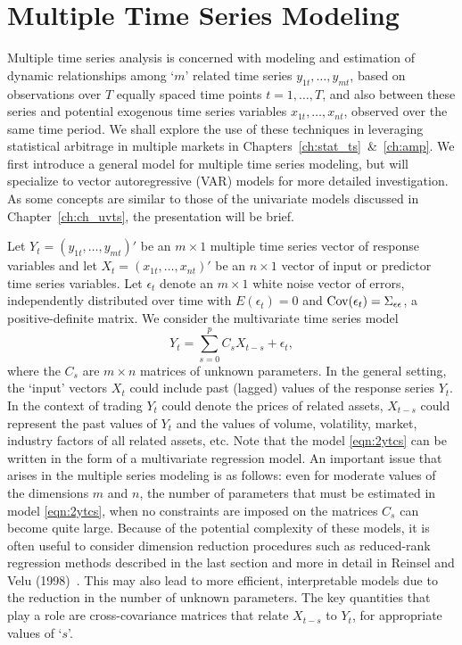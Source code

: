 \section{Multiple Time Series Modeling \label{sec:mutimserimod}}


Multiple time series analysis is concerned with modeling and estimation of dynamic relationships among `$m$' related time series $y_{1t}, \ldots, y_{mt}$, based on observations over $T$ equally spaced time points $t= 1, \ldots, T$, and also between these series and potential exogenous time series variables $x_{1t}, \ldots, x_{nt}$, observed over the same time period. We shall explore the use of these techniques in leveraging statistical arbitrage in multiple markets in Chapters~\ref{ch:stat_ts}~\&~\ref{ch:amp}. We first introduce a general model for multiple time series modeling, but will specialize to vector autoregressive (VAR) models for more detailed investigation. As some concepts are similar to those of the univariate models discussed in Chapter~\ref{ch:ch_uvts}, the presentation will be brief.


Let $Y_t= (y_{1t}, \ldots, y_{mt})'$ be an $m \times 1$ multiple time series vector of response variables and let $X_t=(x_{1t}, \ldots, x_{nt})'$ be an $n \times 1$ vector of input or predictor time series variables. Let $\epsilon_t$ denote an $m \times 1$ white noise vector of errors, independently distributed over time with $E(\epsilon_t)= 0$ and $\operatorname{Cov}(\epsilon_t)= \Sigma_{\epsilon\epsilon}$, a positive-definite matrix. We consider the multivariate time series model
	\begin{equation} \label{eqn:2ytcs}
	Y_{t} = \sum_{s=0}^{p} C_s X_{t-s} + \epsilon_t,
	\end{equation}
where the $C_s$ are $m \times n$ matrices of unknown parameters. In the general setting, the `input' vectors $X_t$ could include past (lagged) values of the response series $Y_t$. In the context of trading $Y_t$ could denote the prices of related assets, $X_{t-s}$ could represent the past values of $Y_t$ and the values of volume, volatility, market, industry factors of all related assets, etc. Note that the model \eqref{eqn:2ytcs} can be written in the form of a multivariate regression model. An important issue that arises in the multiple series modeling is as follows: even for moderate values of the dimensions $m$ and $n$, the number of parameters that must be estimated in model \eqref{eqn:2ytcs}, when no constraints are imposed on the matrices $C_s$ can become quite large. Because of the potential complexity of these models, it is often useful to consider dimension reduction procedures such as reduced-rank regression methods described in the last section and more in detail in Reinsel and Velu (1998)~\cite{velurein}. This may also lead to more efficient, interpretable models due to the reduction in the number of unknown parameters. The key quantities that play a role are cross-covariance matrices that relate $X_{t-s}$ to $Y_t$, for appropriate values of `$s$'. 


